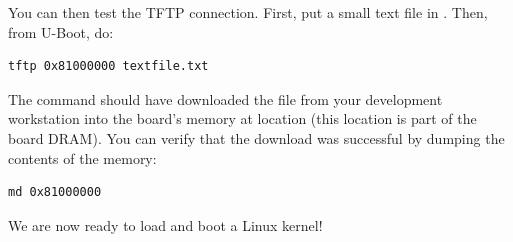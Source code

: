 You can then test the TFTP connection.  First, put a small text
file in . Then, from U-Boot, do:

\begin{verbatim}
tftp 0x81000000 textfile.txt
\end{verbatim}



The  command should have downloaded the
 file from your development workstation into the
board's memory at location  (this location is part of
the board DRAM). You can verify that the download was successful by
dumping the contents of the memory:

\begin{verbatim}
md 0x81000000
\end{verbatim}

We are now ready to load and boot a Linux kernel!
